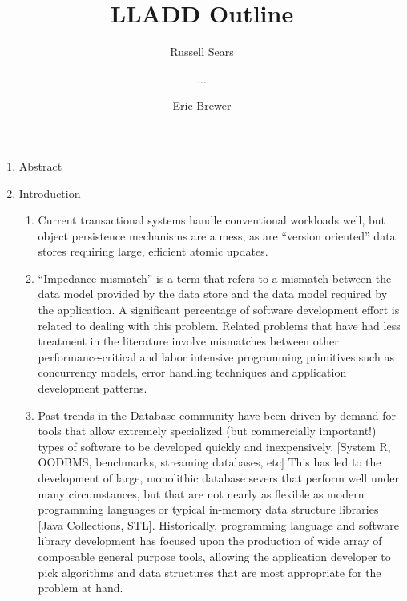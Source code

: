 \documentclass[letterpaper,english]{article}
\begin{document}
\title{LLADD Outline }


\author{Russell Sears \and ... \and Eric Brewer}

\maketitle



\begin{enumerate}

\item Abstract

\item Introduction 

\begin{enumerate}

  \item Current transactional systems handle conventional workloads
  well, but object persistence mechanisms are a mess, as are
  {}``version oriented'' data stores requiring large, efficient atomic
  updates.

  \item {}``Impedance mismatch'' is a term that refers to a mismatch
  between the data model provided by the data store and the data model
  required by the application. A significant percentage of software
  development effort is related to dealing with this problem. Related
  problems that have had less treatment in the literature involve
  mismatches between other performance-critical and labor intensive
  programming primitives such as concurrency models, error handling
  techniques and application development patterns.

  \item Past trends in the Database community have been driven by
  demand for tools that allow extremely specialized (but commercially
  important!)  types of software to be developed quickly and
  inexpensively. {[}System R, OODBMS, benchmarks, streaming databases,
  etc{]} This has led to the development of large, monolithic database
  severs that perform well under many circumstances, but that are not
  nearly as flexible as modern programming languages or typical
  in-memory data structure libraries {[}Java Collections,
  STL{]}. Historically, programming language and software library
  development has focused upon the production of wide array of
  composable general purpose tools, allowing the application developer
  to pick algorithms and data structures that are most appropriate for
  the problem at hand.


\end{enumerate}
\end{enumerate}
\end{document}
